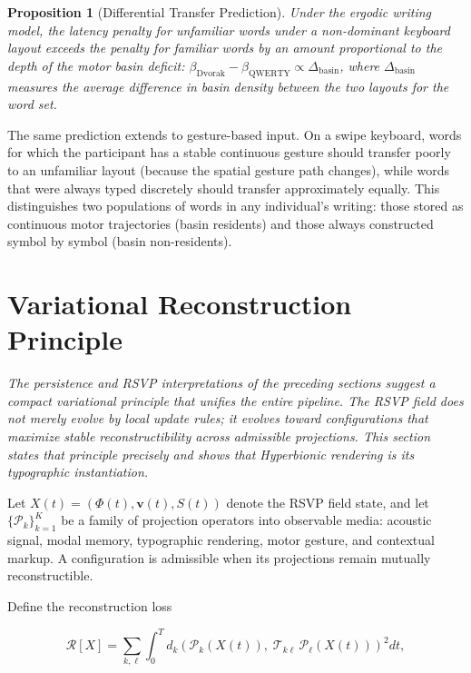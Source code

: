 \documentclass[12pt, a4paper]{article}
\newtheorem{proposition}{Proposition}
\begin{document}
\begin{proposition}[Differential Transfer Prediction]
Under the ergodic writing model, the latency penalty for unfamiliar words under a non-dominant keyboard layout exceeds the penalty for familiar words by an amount proportional to the depth of the motor basin deficit: $\beta_{\mathrm{Dvorak}} - \beta_{\mathrm{QWERTY}} \propto \Delta_{\mathrm{basin}}$, where $\Delta_{\mathrm{basin}}$ measures the average difference in basin density between the two layouts for the word set.
\end{proposition}

The same prediction extends to gesture-based input. On a swipe keyboard, words for which the participant has a stable continuous gesture should transfer poorly to an unfamiliar layout (because the spatial gesture path changes), while words that were always typed discretely should transfer approximately equally. This distinguishes two populations of words in any individual's writing: those stored as continuous motor trajectories (basin residents) and those always constructed symbol by symbol (basin non-residents).


\section{Variational Reconstruction Principle}

\noindent\textit{The persistence and RSVP interpretations of the preceding sections suggest a compact variational principle that unifies the entire pipeline. The RSVP field does not merely evolve by local update rules; it evolves toward configurations that maximize stable reconstructibility across admissible projections. This section states that principle precisely and shows that Hyperbionic rendering is its typographic instantiation.}

Let $X(t) = (\Phi(t), \mathbf{v}(t), S(t))$ denote the RSVP field state, and let $\{\mathcal{P}_k\}_{k=1}^K$ be a family of projection operators into observable media: acoustic signal, modal memory, typographic rendering, motor gesture, and contextual markup. A configuration is admissible when its projections remain mutually reconstructible.

Define the reconstruction loss

\begin{equation}
\mathcal{R}[X]
= \sum_{k,\ell} \int_0^T
d_k\!\left(\mathcal{P}_k(X(t)),\; \mathcal{T}_{k\ell}\,\mathcal{P}_\ell(X(t))\right)^2 dt,
\label{eq:RecLoss}
\end{equation}
\end{document}
